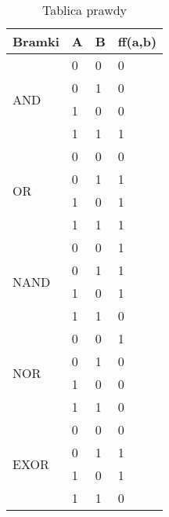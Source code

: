 \documentclass[a4paper]{article}
\begin{document}
\begin{center}

\begin{table}[h]
\centering\caption{Tablica prawdy}

\begin{tabular}{|l|l|l|l|}
\hline

                    Bramki & A & B & ff(a,b)\\
\hline
\hline  
\hline  
   

\multirow{4}{*}{AND}    
                       & 0 & 0 & 0 \\ \cline{2-4} 
                       & 0 & 1 & 0 \\ \cline{2-4} 
                       & 1 & 0 & 0 \\ \cline{2-4} 
                       & 1 & 1 & 1 \\ \cline{1-4} 
                       
                       
 \hline 
 \hline                       
\multirow{4}{*}{OR}    
                       & 0 & 0 & 0 \\ \cline{2-4} 
                       & 0 & 1 & 1 \\ \cline{2-4} 
                       & 1 & 0 & 1 \\ \cline{2-4} 
                       & 1 & 1 & 1 \\ \cline{1-4}
                       
                       
 \hline  
 \hline                      
\multirow{4}{*}{NAND}    
                       & 0 & 0 & 1 \\ \cline{2-4} 
                       & 0 & 1 & 1 \\ \cline{2-4} 
                       & 1 & 0 & 1 \\ \cline{2-4} 
                       & 1 & 1 & 0 \\ \cline{1-4}
                       
                       
  \hline
  \hline                       
\multirow{4}{*}{NOR}    
                       & 0 & 0 & 1 \\ \cline{2-4} 
                       & 0 & 1 & 0 \\ \cline{2-4} 
                       & 1 & 0 & 0 \\ \cline{2-4} 
                       & 1 & 1 & 0 \\ \cline{1-4}
                       
                       
 \hline 
 \hline                       
\multirow{4}{*}{EXOR}    
                       & 0 & 0 & 0 \\ \cline{2-4} 
                       & 0 & 1 & 1 \\ \cline{2-4} 
                       & 1 & 0 & 1 \\ \cline{2-4} 
                       & 1 & 1 & 0 \\ \cline{1-4} 
                       

\end{tabular}
\end{table}
\end{center}
\end{document}
